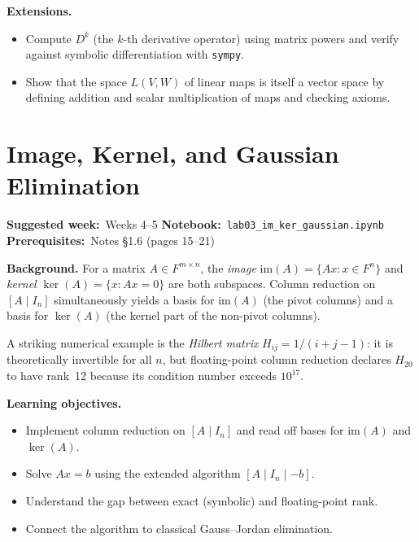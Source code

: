 \documentclass[11pt, a4paper]{article}
\newcommand{\labmeta}[3]{%
  \begin{prereqbox}
  \textbf{Suggested week:}~#1 \quad
  \textbf{Notebook:}~\texttt{#2} \quad
  \textbf{Prerequisites:}~#3
  \end{prereqbox}
  \vspace{4pt}
}
\newcommand{\objectives}[1]{%
  \textbf{\color{prereqcolor}Learning objectives.}\vspace{2pt}
  \begin{itemize}[leftmargin=1.6em, itemsep=1pt] #1 \end{itemize}
}
\newcommand{\extensions}[1]{%
  \textbf{\color{notecolor}Extensions.}
  \begin{itemize}[leftmargin=1.6em, itemsep=1pt] #1 \end{itemize}
}
\begin{document}
\extensions{
  \item Compute $D^k$ (the $k$-th derivative operator) using matrix powers and
        verify against symbolic differentiation with \texttt{sympy}.
  \item Show that the space $L(V,W)$ of linear maps is itself a vector space
        by defining addition and scalar multiplication of maps and checking axioms.
}

\section{Image, Kernel, and Gaussian Elimination}
\label{lab:imker}

\labmeta{Weeks 4--5}{lab03\_im\_ker\_gaussian.ipynb}{Notes §1.6 (pages 15--21)}

\vspace{4pt}

\noindent\textbf{Background.}
For a matrix $A \in F^{m \times n}$, the \emph{image} $\mathrm{im}(A) = \{Ax : x \in F^n\}$
and \emph{kernel} $\ker(A) = \{x : Ax = 0\}$ are both subspaces.
Column reduction on $[A \mid I_n]$ simultaneously yields a basis for
$\mathrm{im}(A)$ (the pivot columns) and a basis for $\ker(A)$
(the kernel part of the non-pivot columns).

A striking numerical example is the \emph{Hilbert matrix}
$H_{ij} = 1/(i+j-1)$: it is theoretically invertible for all $n$,
but floating-point column reduction declares $H_{20}$ to have rank~12
because its condition number exceeds $10^{17}$.

\objectives{
  \item Implement column reduction on $[A \mid I_n]$ and read off bases for $\mathrm{im}(A)$ and $\ker(A)$.
  \item Solve $Ax = b$ using the extended algorithm $[A \mid I_n \mid {-b}]$.
  \item Understand the gap between exact (symbolic) and floating-point rank.
  \item Connect the algorithm to classical Gauss--Jordan elimination.
}
\end{document}
